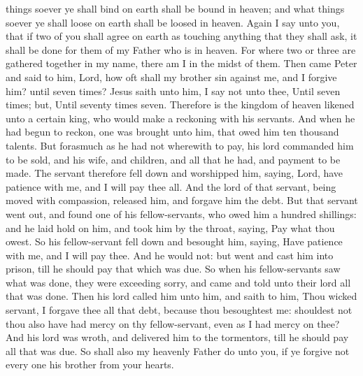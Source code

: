 things soever ye shall bind on earth shall be bound in heaven; and what things soever ye shall loose on earth shall be loosed in heaven. Again I say unto you, that if two of you shall agree on earth as touching anything that they shall ask, it shall be done for them of my Father who is in heaven. For where two or three are gathered together in my name, there am I in the midst of them.  Then came Peter and said to him, Lord, how oft shall my brother sin against me, and I forgive him? until seven times? Jesus saith unto him, I say not unto thee, Until seven times; but, Until seventy times seven. Therefore is the kingdom of heaven likened unto a certain king, who would make a reckoning with his servants. And when he had begun to reckon, one was brought unto him, that owed him ten thousand talents. But forasmuch as he had not wherewith to pay, his lord commanded him to be sold, and his wife, and children, and all that he had, and payment to be made. The servant therefore fell down and worshipped him, saying, Lord, have patience with me, and I will pay thee all. And the lord of that servant, being moved with compassion, released him, and forgave him the debt. But that servant went out, and found one of his fellow-servants, who owed him a hundred shillings: and he laid hold on him, and took him by the throat, saying, Pay what thou owest. So his fellow-servant fell down and besought him, saying, Have patience with me, and I will pay thee. And he would not: but went and cast him into prison, till he should pay that which was due. So when his fellow-servants saw what was done, they were exceeding sorry, and came and told unto their lord all that was done. Then his lord called him unto him, and saith to him, Thou wicked servant, I forgave thee all that debt, because thou besoughtest me: shouldest not thou also have had mercy on thy fellow-servant, even as I had mercy on thee? And his lord was wroth, and delivered him to the tormentors, till he should pay all that was due. So shall also my heavenly Father do unto you, if ye forgive not every one his brother from your hearts. 


